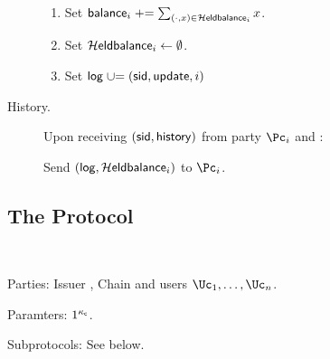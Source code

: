 \begin{functionality}
\begin{description}
		\begin{enumerate}
			
			
			\item Set $\mathsf{balance}_i  \mathrel{+}= \sum_{(\cdot,x) \in \mathcal{H}\mathsf{eldbalance}_i} x$.
			
			\item Set $\mathcal{H}\mathsf{eldbalance}_i  \leftarrow \emptyset$.
			
			\item Set $\mathsf{log} \mathrel{\cup}= (\mathsf{sid},\mathsf{update},i)$
			
			
		\end{enumerate}

		
		
		\item[History.]     Upon receiving $(\mathsf{sid},\mathsf{history})$ from  party $\Pc_i$ and \Cc:  
		
		Send $(\mathsf{log},\mathcal{H}\mathsf{eldbalance}_i)$ to  $\Pc_i$.	 
		
	\end{description}

\end{functionality}

\subsection{The Protocol}\label{sec:MainProtocol:Protocol}


\begin{protocol}~\label{prot:ConfidentialTransactions}

\item[Parties:] Issuer \Ic, Chain \Cc and users  $\Uc_1, \ldots,\Uc_n$.

\item[Paramters:]	$1^{\kappa_{\mathsf c}}$.

\item[Subprotocols:]  See below.
\end{protocol}


